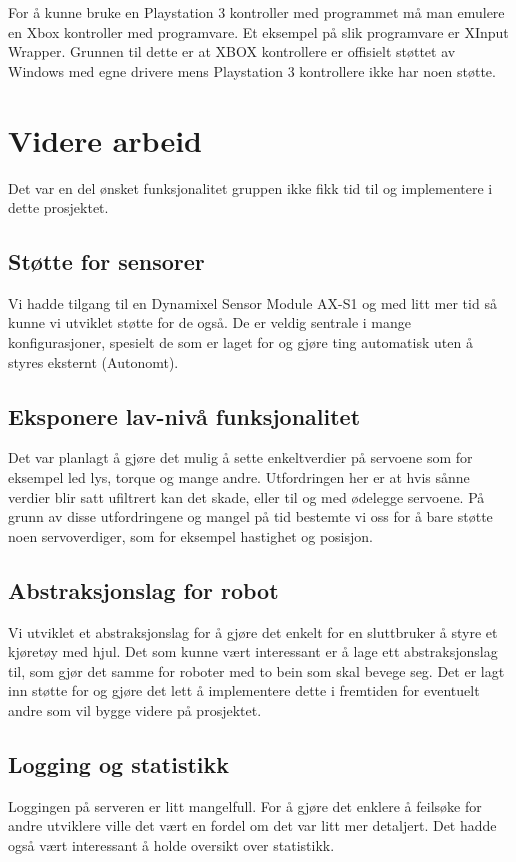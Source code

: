\documentclass[12pt]{report}
\begin{document}
For å kunne bruke en Playstation 3 kontroller med programmet må man emulere en Xbox kontroller med programvare. Et eksempel på slik programvare er XInput Wrapper\cite{XInput}. Grunnen til dette er at XBOX kontrollere er offisielt støttet av Windows med egne drivere mens Playstation 3 kontrollere ikke har noen støtte.

\clearpage

\chapter{Videre arbeid}
Det var en del ønsket funksjonalitet gruppen ikke fikk tid til og implementere i dette prosjektet.

\section{Støtte for sensorer}
Vi hadde tilgang til en Dynamixel Sensor Module AX-S1\cite{DynaSens} og med litt mer tid så kunne vi utviklet støtte for de også. De er veldig sentrale i mange konfigurasjoner, spesielt de som er laget for og gjøre ting automatisk uten å styres eksternt (Autonomt).

\section{Eksponere lav-nivå funksjonalitet}
Det var planlagt å gjøre det mulig å sette enkeltverdier på servoene som for eksempel led lys, torque og mange andre. Utfordringen her er at hvis sånne verdier blir satt ufiltrert kan det skade, eller til og med ødelegge servoene. På grunn av disse utfordringene og mangel på tid bestemte vi oss for å bare støtte noen servoverdiger, som for eksempel hastighet og posisjon.

\section{Abstraksjonslag for robot}
Vi utviklet et abstraksjonslag for å gjøre det enkelt for en sluttbruker å styre et kjøretøy med hjul. Det som kunne vært interessant er å lage ett abstraksjonslag til, som gjør det samme for roboter med to bein som skal bevege seg. Det er lagt inn støtte for og gjøre det lett å implementere dette i fremtiden for eventuelt andre som vil bygge videre på prosjektet.

\section{Logging og statistikk}
Loggingen på serveren er litt mangelfull. For å gjøre det enklere å feilsøke for andre utviklere ville det vært en fordel om det var litt mer detaljert. Det hadde også vært interessant å holde oversikt over statistikk.
\end{document}
